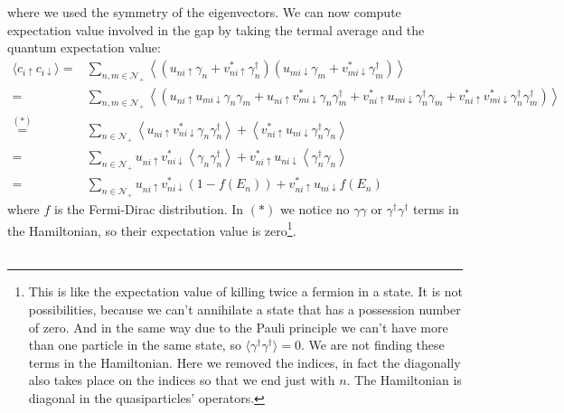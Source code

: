 \documentclass[../main.tex]{subfile}
\begin{document}
where we used the symmetry of the eigenvectors. We can now compute expectation value involved in the gap by taking the termal average and the quantum expectation value:
\begin{equation}\label{eq:transfo_c_up_c_down_BdG}
\begin{aligned}
    \langle c_{i\uparrow}c_{i\downarrow} \rangle =& \sum_{n,m\in\mathcal{N}_+} \left\langle\left(u_{ni\uparrow}\gamma_n + v_{ni\uparrow}^{\ast}\gamma_{n}^{\dagger}\right)\left(u_{mi\downarrow}\gamma_m + v_{mi\downarrow}^{\ast}\gamma_{m}^{\dagger}\right)\right\rangle\\
     =&  \sum_{n,m\in\mathcal{N}_+} \left\langle\left(u_{ni\uparrow} u_{mi\downarrow}\gamma_n\gamma_m + u_{ni\uparrow} v_{mi\downarrow}^{\ast}\gamma_n\gamma_{m}^{\dagger} + v_{ni\uparrow}^{\ast}u_{mi\downarrow}\gamma_{n}^{\dagger} \gamma_m+  v_{ni\uparrow}^{\ast} v_{mi\downarrow}^{\ast}\gamma_{n}^{\dagger}\gamma_{m}^{\dagger}  \right)\right\rangle\\
     \stackrel{(\ast)}{=}&  \sum_{n\in\mathcal{N}_+} \left\langle u_{ni\uparrow} v_{ni\downarrow}^{\ast}\gamma_n\gamma_{n}^{\dagger}\right\rangle + \left\langle v_{ni\uparrow}^{\ast}u_{ni\downarrow}\gamma_{n}^{\dagger}\gamma_{n}\right\rangle\\     
     =&  \sum_{n\in\mathcal{N}_+} u_{ni\uparrow} v_{ni\downarrow}^{\ast}\left\langle\gamma_n\gamma_{n}^{\dagger}\right\rangle + v_{ni\uparrow}^{\ast}u_{ni\downarrow}\left\langle \gamma_{n}^{\dagger}\gamma_{n}\right\rangle\\
     =&  \sum_{n\in\mathcal{N}_+} u_{ni\uparrow} v_{ni\downarrow}^{\ast} \left(1-f(E_n)\right) + v_{ni\uparrow}^{\ast}u_{ni\downarrow}f(E_n)
\end{aligned}
\end{equation}
where $f$ is the Fermi-Dirac distribution. In $(\ast)$ we notice no $\gamma\gamma$ or $\gamma^{\dagger}\gamma^{\dagger}$ terms in the Hamiltonian, so their expectation 
value is zero\footnote{This is like the expectation value of killing twice a fermion in a state. It is not possibilities, because we can't annihilate a state that has a possession number of zero.
And in the same way due to the Pauli principle we can't have more than one particle in the same state, so $\langle \gamma^{\dagger} \gamma^{\dagger} \rangle = 0$. We are not 
finding these terms in the Hamiltonian. Here we removed the indices, in fact the diagonally also takes place on the indices so that we end just with $n$.
The Hamiltonian is diagonal in the quasiparticles' operators.}.\\
\\
\end{document}
